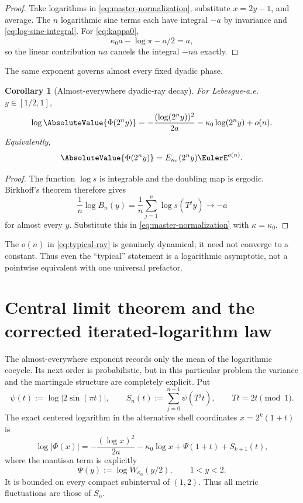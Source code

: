 \documentclass[11pt,oneside]{article}
\newtheorem{corollary}[corollary]{Corollary}
\theoremstyle{definition}
\theoremstyle{remark}
\newcommand{\Phiup}{\Phi}
\begin{document}
\begin{proof}
Take logarithms in \eqref{eq:master-normalization}, substitute $x=2y-1$, and average.
The $n$ logarithmic sine terms each have integral $-a$ by invariance and
\eqref{eq:log-sine-integral}.  For \eqref{eq:kappa0},
\[
 \kappa_0a-\log\pi-a/2=a,
\]
so the linear contribution $na$ cancels the integral $-na$ exactly.
\end{proof}

The same exponent governs almost every fixed dyadic phase.

\begin{corollary}[Almost-everywhere dyadic-ray decay]
\label{cor:typical-ray}
For Lebesgue-a.e. $y\in[1/2,1]$,
\begin{equation}
 \log\AbsoluteValue{\Phiup(2^ny)}
 =-\frac{(\log(2^ny))^2}{2a}
  -\kappa_0\log(2^ny)+o(n).
 \label{eq:typical-ray}
\end{equation}
Equivalently,
\[
 \AbsoluteValue{\Phiup(2^ny)}=E_{\kappa_0}(2^ny)\EulerE^{o(n)}.
\]
\end{corollary}

\begin{proof}
The function $\log s$ is integrable and the doubling map is ergodic.  Birkhoff's theorem
therefore gives
\[
 \frac1n\log B_n(y)=\frac1n\sum_{j=1}^{n}\log s(T^jy)\longrightarrow-a
\]
for almost every $y$.  Substitute this in \eqref{eq:master-normalization} with
$\kappa=\kappa_0$.
\end{proof}

The $o(n)$ in \eqref{eq:typical-ray} is genuinely dynamical; it need not converge to a
constant.  Thus even the ``typical'' statement is a logarithmic asymptotic, not a pointwise
equivalent with one universal prefactor.


\section{Central limit theorem and the corrected iterated-logarithm law}
\label{sec:fluctuations}

The almost-everywhere exponent records only the mean of the logarithmic cocycle.  Its next
order is probabilistic, but in this particular problem the variance and the martingale
structure are completely explicit.  Put
\begin{equation}
 \psi(t):=\log|2\sin(\pi t)|,
 \qquad
 S_n(t):=\sum_{j=0}^{n-1}\psi(T^jt),
 \qquad Tt=2t\pmod1.
 \label{eq:psi-Sn}
\end{equation}
The exact centered logarithm in the alternative shell coordinates $x=2^k(1+t)$ is
\begin{equation}
 \log|\Phi(x)|
 =-\frac{(\log x)^2}{2a}-\kappa_0\log x+\Psi(1+t)+S_{k+1}(t),
 \label{eq:centered-log-final}
\end{equation}
where the mantissa term is explicitly
\begin{equation}
 \Psi(y):=\log W_{\kappa_0}(y/2),\qquad 1<y<2.
 \label{eq:Psi-mantissa}
\end{equation}
It is bounded on every compact subinterval of $(1,2)$.  Thus all metric fluctuations are
those of $S_n$.
\end{document}
